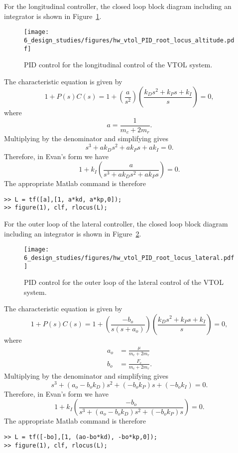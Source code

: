 For the longitudinal controller, the closed loop block diagram including an integrator is shown in Figure~\ref{fig:hw_vtol_PID_root_locus_altitude}.
\begin{figure}[htbp]
   \centering
   \texttt{[image: 6\_design\_studies/figures/hw\_vtol\_PID\_root\_locus\_altitude.pdf]}
   \caption{PID control for the longitudinal control of the VTOL system.}
   \label{fig:hw_vtol_PID_root_locus_altitude}
\end{figure}
The characteristic equation is given by
\[
1+P(s)C(s) = 1+\left(\frac{a}{s^2}\right)\left(\frac{k_Ds^2+k_Ps+k_I}{s}\right) = 0,
\]
where
\[
a = \frac{1}{m_c+2m_r}.
\]
Multiplying by the denominator and simplifying gives
\[
s^3+ak_Ds^2 + ak_Ps + ak_I = 0.
\]
Therefore, in Evan's form we have
\[
1 + k_I\left(\frac{a}{s^3 + ak_Ds^2 + ak_Ps}\right) = 0.
\]
The appropriate Matlab command is therefore
\begin{lstlisting}
>> L = tf([a],[1, a*kd, a*kp,0]);
>> figure(1), clf, rlocus(L);
\end{lstlisting}

For the outer loop of the lateral controller, the closed loop block diagram including an integrator is shown in Figure~\ref{fig:hw_vtol_PID_root_locus_lateral}.
\begin{figure}[htbp]
   \centering
   \texttt{[image: 6\_design\_studies/figures/hw\_vtol\_PID\_root\_locus\_lateral.pdf]}
   \caption{PID control for the outer loop of the lateral control of the VTOL system.}
   \label{fig:hw_vtol_PID_root_locus_lateral}
\end{figure}
The characteristic equation is given by
\[
1+P(s)C(s) = 1+\left(\frac{-b_o}{s(s+a_o)}\right)\left(\frac{k_Ds^2+k_Ps+k_I}{s}\right) = 0,
\]
where
\begin{align*}
a_o &= \frac{\mu}{m_c+2m_r} \\
b_o &= \frac{F_e}{m_c+2m_r}.
\end{align*}
Multiplying by the denominator and simplifying gives
\[
s^3+(a_o-b_ok_D)s^2 + (-b_ok_P)s + (-b_ok_I) = 0.
\]
Therefore, in Evan's form we have
\[
1 + k_I\left(\frac{-b_o}{s^3 + (a_o-b_ok_D)s^2 + (-b_ok_P)s}\right) = 0.
\]
The appropriate Matlab command is therefore
\begin{lstlisting}
>> L = tf([-bo],[1, (ao-bo*kd), -bo*kp,0]);
>> figure(1), clf, rlocus(L);
\end{lstlisting}
